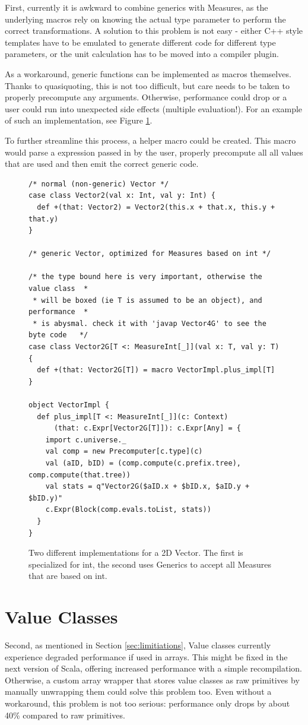 \documentclass[12pt,oneside,a4paper]{scrbook}
\begin{document}
First, currently it is awkward to combine generics with Measures, as the underlying macros rely on knowing the actual type parameter to perform the correct transformations. A solution to this problem is not easy - either C++ style templates have to be emulated to generate different code for different type parameters, or the unit calculation has to be moved into a compiler plugin.

As a workaround, generic functions can be implemented as macros themselves. Thanks to quasiquoting, this is not too difficult, but care needs to be taken to properly precompute any arguments. Otherwise, performance could drop or a user could run into unexpected side effects (multiple evaluation!). For an example of such an implementation, see Figure \ref{code:scala_generic}.

To further streamline this process, a helper macro could be created. This macro would parse a expression passed in by the user, properly precompute all all values that are used and then emit the correct generic code.

\begin{figure}
\begin{verbatim}
/* normal (non-generic) Vector */
case class Vector2(val x: Int, val y: Int) {
  def +(that: Vector2) = Vector2(this.x + that.x, this.y + that.y)
}

/* generic Vector, optimized for Measures based on int */

/* the type bound here is very important, otherwise the value class  *
 * will be boxed (ie T is assumed to be an object), and performance  *
 * is abysmal. check it with 'javap Vector4G' to see the byte code   */
case class Vector2G[T <: MeasureInt[_]](val x: T, val y: T) {
  def +(that: Vector2G[T]) = macro VectorImpl.plus_impl[T]
}

object VectorImpl {
  def plus_impl[T <: MeasureInt[_]](c: Context)
      (that: c.Expr[Vector2G[T]]): c.Expr[Any] = {
    import c.universe._
    val comp = new Precomputer[c.type](c)
    val (aID, bID) = (comp.compute(c.prefix.tree), comp.compute(that.tree))
    val stats = q"Vector2G($aID.x + $bID.x, $aID.y + $bID.y)"
    c.Expr(Block(comp.evals.toList, stats))
  }
}
\end{verbatim}
\caption{Two different implementations for a 2D Vector. The first is specialized for int, the second uses Generics to accept all Measures that are based on int.}
\label{code:scala_generic}
\end{figure}

\section{Value Classes}
Second, as mentioned in Section \ref{sec:limitiations}, Value classes currently experience degraded performance if used in arrays. This might be fixed in the next version of Scala, offering increased performance with a simple recompilation. Otherwise, a custom array wrapper that stores value classes as raw primitives by manually unwrapping them could solve this problem too. Even without a workaround, this problem is not too serious: performance only drops by about 40\% compared to raw primitives.
\end{document}
